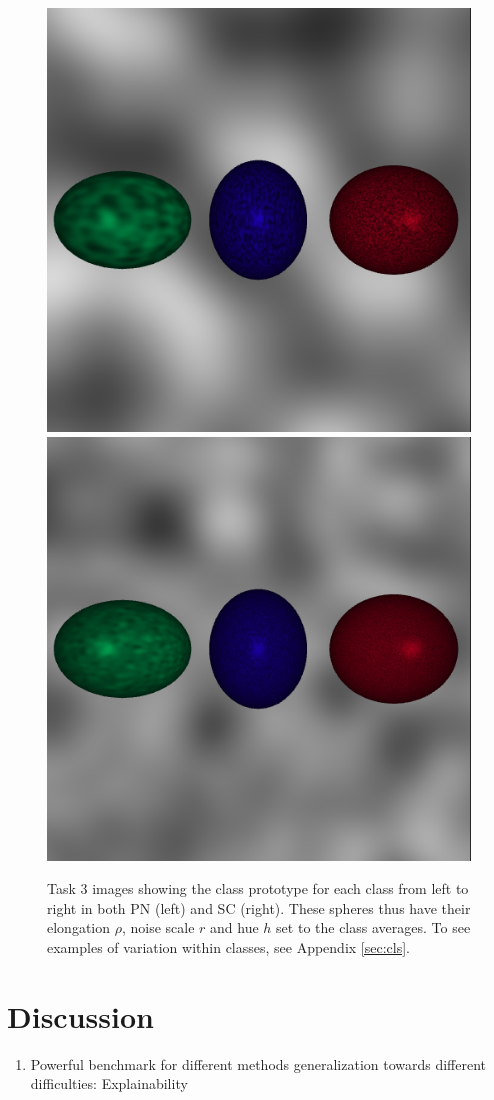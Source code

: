 \documentclass[12pt,fleqn]{article}
\begin{document}
\begin{figure}[H]
    \centering
        \includegraphics[width=.48\linewidth]{t3-avg-perlin}
        \includegraphics[width=.48\linewidth]{t3-avg-sc}
    \caption{
       Task 3 images showing the class prototype for each class from left to right in both PN (left) and SC (right).
       These spheres thus have their elongation $\rho$, noise scale $r$ and hue $h$ set to the class averages.
       To see examples of variation within classes, see Appendix \ref{sec:cls}.
    }
    \label{fig:t3}
\end{figure}\noindent

\section{Discussion}%
\label{sec:disc}
\begin{enumerate}
    \item Powerful benchmark for different methods generalization towards different difficulties: Explainability
\end{enumerate}

\clearpage

\printbibliography[heading=bibintoc]

\clearpage

\appendix
\end{document}

